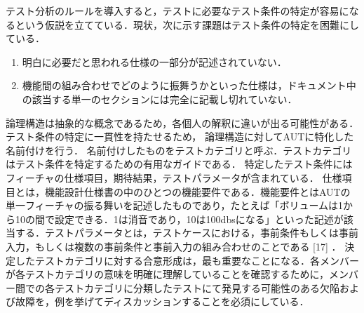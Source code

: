 \documentclass[a4paper,11pt]{jreport}
\begin{document}
テスト分析のルールを導入すると，テストに必要なテスト条件の特定が容易になるという仮説を立てている．現状，次に示す課題はテスト条件の特定を困難にしている．
\begin{enumerate}
\item 明白に必要だと思われる仕様の一部分が記述されていない．
\item 機能間の組み合わせでどのように振舞うかといった仕様は，ドキュメント中の該当する単一のセクションには完全に記載し切れていない．
\end{enumerate}


 論理構造は抽象的な概念であるため，各個人の解釈に違いが出る可能性がある．テスト条件の特定に一貫性を持たせるため， 論理構造に対してAUTに特化した名前付けを行う．
名前付けしたものをテストカテゴリと呼ぶ．テストカテゴリはテスト条件を特定するための有用なガイドである．
特定したテスト条件にはフィーチャの仕様項目，期待結果，テストパラメータが含まれている．
仕様項目とは，機能設計仕様書の中のひとつの機能要件である．機能要件とはAUTの単一フィーチャの振る舞いを記述したものであり，たとえば「ボリュームは1から10の間で設定できる．1は消音であり，10は100dbsになる」といった記述が該当する．テストパラメータとは，テストケースにおける，事前条件もしくは事前入力，もしくは複数の事前条件と事前入力の組み合わせのことである [17] ．
      決定したテストカテゴリに対する合意形成は，最も重要なことになる．各メンバーが各テストカテゴリの意味を明確に理解していることを確認するために，メンバー間での各テストカテゴリに分類したテストにて発見する可能性のある欠陥および故障を，例を挙げてディスカッションすることを必須にしている．
\end{document}
